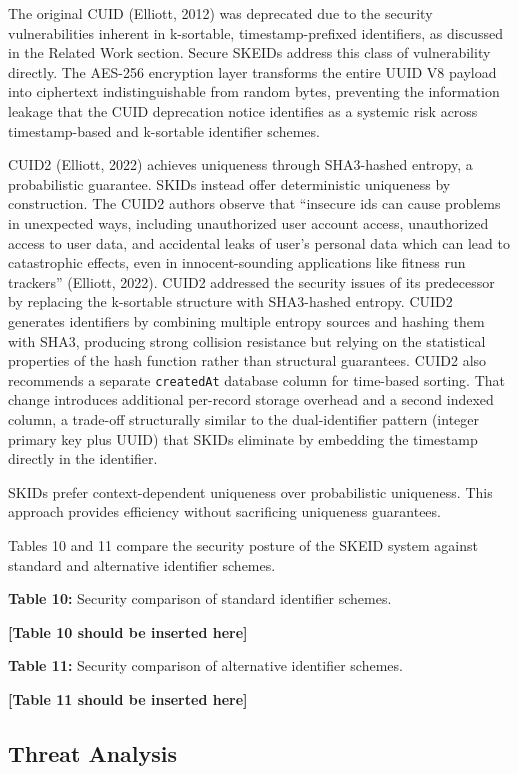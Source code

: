 \documentclass[fleqn,10pt,lineno]{wlpeerj}
\begin{document}
The original CUID (Elliott, 2012) was deprecated due to the security
vulnerabilities inherent in k-sortable, timestamp-prefixed identifiers,
as discussed in the Related Work section. Secure SKEIDs address this
class of vulnerability directly. The AES-256 encryption layer transforms
the entire UUID V8 payload into ciphertext indistinguishable from random
bytes, preventing the information leakage that the CUID deprecation
notice identifies as a systemic risk across timestamp-based and
k-sortable identifier schemes.

CUID2 (Elliott, 2022) achieves uniqueness through SHA3-hashed entropy, a
probabilistic guarantee. SKIDs instead offer deterministic uniqueness by
construction. The CUID2 authors observe that ``insecure ids can cause
problems in unexpected ways, including unauthorized user account access,
unauthorized access to user data, and accidental leaks of user's
personal data which can lead to catastrophic effects, even in
innocent-sounding applications like fitness run trackers'' (Elliott,
2022). CUID2 addressed the security issues of its predecessor by
replacing the k-sortable structure with SHA3-hashed entropy. CUID2
generates identifiers by combining multiple entropy sources and hashing
them with SHA3, producing strong collision resistance but relying on the
statistical properties of the hash function rather than structural
guarantees. CUID2 also recommends a separate \texttt{createdAt} database
column for time-based sorting. That change introduces additional
per-record storage overhead and a second indexed column, a trade-off
structurally similar to the dual-identifier pattern (integer primary key
plus UUID) that SKIDs eliminate by embedding the timestamp directly in
the identifier.

SKIDs prefer context-dependent uniqueness over probabilistic uniqueness.
This approach provides efficiency without sacrificing uniqueness
guarantees.

Tables 10 and 11 compare the security posture of the SKEID system
against standard and alternative identifier schemes.

\textbf{Table 10:} Security comparison of standard identifier schemes.

\textbf{{[}Table 10 should be inserted here{]}}

\textbf{Table 11:} Security comparison of alternative identifier
schemes.

\textbf{{[}Table 11 should be inserted here{]}}

\subsection{Threat Analysis}\label{threat-analysis}
\end{document}
